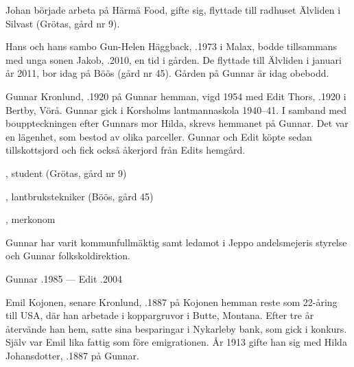 Johan började arbeta på Härmä Food, gifte sig, flyttade till radhuset Älvliden i Silvast (Grötas, gård nr 9).

Hans och hans sambo Gun-Helen Häggback, .1973 i Malax, bodde tillsammans med unga sonen Jakob, .2010, en tid i gården. De flyttade till Älvliden i januari år 2011, bor idag på Böös (gård nr 45). Gården på Gunnar är idag obebodd.


Gunnar Kronlund, .1920 på Gunnar hemman, vigd 1954 med Edit Thors, .1920 i Bertby, Vörå. Gunnar gick i Korsholms lantmannaskola 1940--41. I samband med bouppteckningen efter Gunnars mor Hilda, skrevs hemmanet på Gunnar. Det var en lägenhet, som bestod av olika parceller. Gunnar och Edit köpte sedan tillskottsjord och fick också åkerjord från Edits hemgård.
\begin{jhchildren}
  \item {}, student (Grötas, gård nr 9)
  \item {}, lantbrukstekniker (Böös, gård 45)
  \item {}, merkonom
\end{jhchildren}

Gunnar har varit kommunfullmäktig samt ledamot i Jeppo andelsmejeris styrelse och Gunnar folkskoldirektion.

Gunnar .1985  ---  Edit .2004






Emil Kojonen, senare Kronlund, .1887 på Kojonen hemman reste som 22-åring till USA, där han arbetade i koppargruvor i Butte, Montana. Efter tre år återvände han hem, satte sina besparingar i Nykarleby bank, som gick i konkurs. Själv var Emil lika fattig som före emigrationen. År 1913 gifte han sig med Hilda Johansdotter, .1887 på Gunnar.
\begin{jhchildren}
  \item {}
  \item {}
\end{jhchildren}

